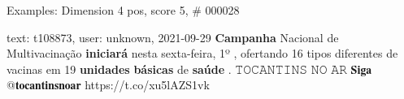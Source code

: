 \begin{frame}{Examples: Dimension 4 pos, score 5, \# 000028}
\footnotesize
\begin{exampleblock}{text: t108873, user: unknown, 2021-09-29}
\textbf{Campanha} Nacional de Multivacinação \textbf{iniciará} nesta 
sexta-feira, 1º , ofertando 16 tipos diferentes de vacinas em 19 
\textbf{unidades} \textbf{básicas} de \textbf{saúde} . 𝚃𝙾𝙲𝙰𝙽𝚃𝙸𝙽𝚂 𝙽𝙾 𝙰𝚁 𝐒𝐢𝐠𝐚 
@𝐭𝐨𝐜𝐚𝐧𝐭𝐢𝐧𝐬𝐧𝐨𝐚𝐫 https://t.co/xu5lAZS1vk 
\end{exampleblock}
\end{frame}

